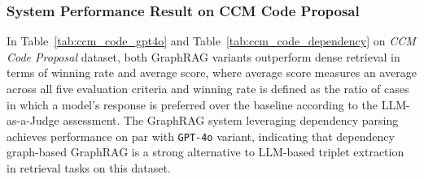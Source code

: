\documentclass[runningheads]{llncs}
\begin{document}
\FloatBarrier  %
\endgroup

\subsubsection{\textbf{System Performance Result on CCM Code Proposal}} In Table~\ref{tab:ccm_code_gpt4o} and Table~\ref{tab:ccm_code_dependency} on \textit{CCM Code Proposal} dataset, both GraphRAG variants outperform dense retrieval in terms of winning rate and average score, where average score measures an average across all five evaluation criteria and winning rate is defined as the ratio of cases in which a model’s response is preferred over the baseline according to the LLM-as-a-Judge assessment. The GraphRAG system leveraging dependency parsing achieves performance on par with \texttt{GPT-4o} variant, indicating that dependency graph-based GraphRAG is a strong alternative to LLM-based triplet extraction in retrieval tasks on this dataset.

\begingroup
\setlength{\intextsep}{6pt}      %
\setlength{\textfloatsep}{6pt}   %
\setlength{\floatsep}{6pt}       %
\setlength{\abovecaptionskip}{2pt}
\setlength{\belowcaptionskip}{2pt}

\FloatBarrier  %

\begin{table}[H]
  \caption{LLM-as-a-Judge on CCM Code Proposal (\texttt{GPT-4o}-based)}
  \label{tab:ccm_code_gpt4o}
  \centering
  {\footnotesize
  }
\end{table}
\end{document}

